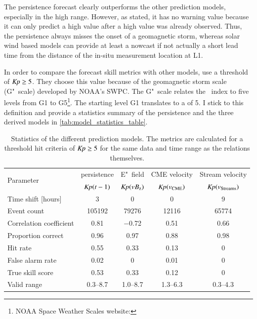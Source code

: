The persistence forecast clearly outperforms the other prediction models, especially in the high \Kp{} range. However, as \citet{Detman1999} stated, it has no warning value because it can only predict a high \Kp{} value after a high \Kp{} value was already observed. Thus, the persistence always misses the onset of a geomagnetic storm, whereas solar wind based models can provide at least a nowcast if not actually a short lead time from the distance of the in-situ measurement location at L1.

In order to compare the \Kp{} forecast skill metrics with other models, \citet{Savani2017} use a threshold of $\textit{Kp}{} \geq 5$. They choose this value because of the geomagnetic storm scale (G"~scale) developed by NOAA's SWPC. The G"~scale relates the \Kp~index to five levels from G1 to G5\footnote{NOAA Space Weather Scales website: }. The starting level G1 translates to a \Kp{} of 5. I stick to this definition and provide a statistics summary of the \Kp{} persistence and the three derived models in \autoref{tab:model_statistics_table}.
\begin{table}[htb]
	\caption{Statistics of the different prediction models. The metrics are calculated for a threshold hit criteria of $\textit{Kp}{} \geq 5$ for the same data and time range as the relations themselves.}
	\label{tab:model_statistics_table}
	\centering
	\begin{tabular}{lcccc}
		\hline\hline
		\multirow{2}{*}{Parameter}	&\Kp{} persistence	&E"~field	&CME velocity 	&Stream velocity\\
			&$\textit{Kp}(t-1)$	&$\textit{Kp}(\text{$vB_\text{z}$})$	&$\textit{Kp}(v_\text{CME})$	&$\textit{Kp}(v_\text{Streams})$\\
		\hline
		Time shift [hours]	&3	&0	&0	&9\\
		Event count	&\num{105192}	&\num{79276}	&\num{12116}	&\num{65774}\\
		Correlation coefficient	&0.81	&\num{-0.72}	&0.51	&0.66\\
		\hline
		Proportion correct	&0.96	&0.97	&0.88	&0.98\\
		Hit rate	&0.55	&0.33	&0.13	&0\\
		False alarm rate	&0.02	&0	&0.01	&0\\
		True skill score	&0.53	&0.33	&0.12	&0\\
		Valid \Kp{} range	&\numrange{0.3}{8.7}	&\numrange{1.0}{8.7}	&\numrange{1.3}{6.3}	&\numrange{0.3}{4.3}\\
		\hline
	\end{tabular}
\end{table}

